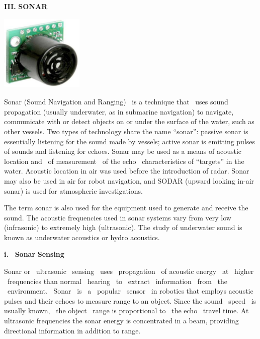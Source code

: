 \documentclass[letterpaper]{article}
\title{}
\author{pavan}
\date{2013-11-18}
\begin{document}
\clearpage\setcounter{page}{1}\pagestyle{Standard}
{
\textbf{III}\textbf{.}\textbf{ }\textbf{S}\textbf{ONAR}}

\begin{center}
\includegraphics[width=3.968cm,height=3.624cm]{III-img1.png}
\end{center}

\bigskip

{
Sonar (Sound Navigation and Ranging) \ is a technique that \ uses sound
propagation (usually underwater, as in submarine navigation) to
navigate, communicate with or detect objects on or under the surface of
the water, such as other vessels. Two types of technology share the
name {\textquotedblleft}sonar{\textquotedblright}: passive sonar is
essentially listening for the sound made by vessels; active sonar is
emitting pulses of sounds and listening for echoes. Sonar may be used
as a means of acoustic location and \ of measurement \ of the echo
\ characteristics of {\textquotedblleft}targets{\textquotedblright} in
the water. Acoustic location in air was used before the introduction of
radar. Sonar may also be used in air for robot navigation, and SODAR
(upward looking in{}-air sonar) is used for atmospheric
investigations.}


\bigskip

{
The term sonar is also used for the equipment used to generate and
receive the sound. The acoustic frequencies used in sonar systems vary
from very low (infrasonic) to extremely high (ultrasonic). The study of
underwater sound is known as underwater acoustics or hydro acoustics.}


\bigskip


\bigskip


\bigskip

{
\textbf{i. }\textbf{\ }\textbf{S}\textbf{o}\textbf{n}\textbf{ar}\textbf{
}\textbf{S}\textbf{e}\textbf{n}\textbf{s}\textbf{i}\textbf{ng}}


\bigskip

{
Sonar or \ ultrasonic \ sensing \ uses \ propagation \ of acoustic
energy \ at \ higher \ frequencies than normal \ hearing \ to \ extract
\ information \ from \ the \ environment. \ Sonar \ is \ a \ popular
\ sensor \ in robotics that employs acoustic pulses and their echoes to
measure range to an object. Since the sound \ speed \ is usually known,
\ the object \ range is proportional to \ the echo \ travel time. At
ultrasonic frequencies the sonar energy is concentrated in a beam,
providing directional information in addition to range.}
\end{document}
